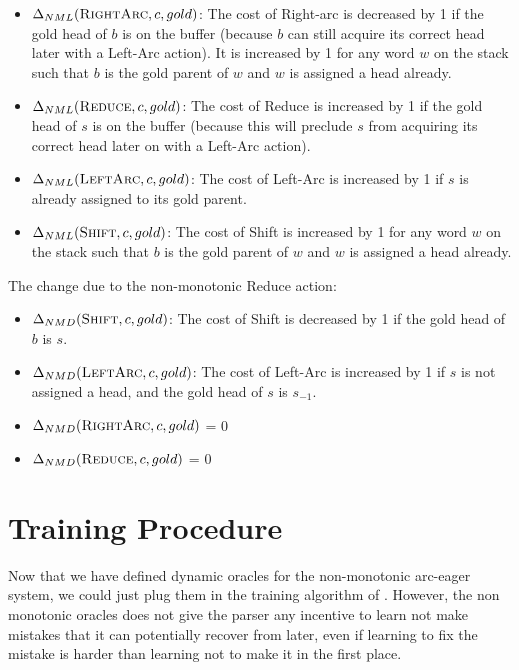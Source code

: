 \documentclass[11pt,letterpaper]{article}
\begin{document}
\begin{itemize}
   \item $\Delta_{NML}(\textsc{RightArc},c,gold)$: The cost of Right-arc is decreased by 1 if the gold head of $b$ is on the buffer
(because $b$ can still acquire its correct head later with a Left-Arc action).
It is increased by 1 for any word $w$ on the stack such that $b$ is the gold
parent of $w$ and $w$ is assigned a head already.

   \item $\Delta_{NML}(\textsc{Reduce},c,gold)$: The cost of Reduce is increased by 1 if the gold head of $s$ is on the buffer
(because this will preclude $s$ from acquiring its correct head later on with
a Left-Arc action).

   \item $\Delta_{NML}(\textsc{LeftArc},c,gold)$: The cost of Left-Arc is increased by 1 if $s$ is already assigned to its gold
parent.

  \item $\Delta_{NML}(\textsc{Shift},c,gold)$: The cost of Shift is increased by 1 for any word $w$ on the stack such that $b$ is the gold
parent of $w$ and $w$ is assigned a head already.
\end{itemize}

The change due to the non-monotonic Reduce action:
\begin{itemize}

   \item $\Delta_{NMD}(\textsc{Shift},c,gold)$: The cost of Shift is decreased by 1 if the gold head of $b$ is $s$.

   \item $\Delta_{NMD}(\textsc{LeftArc},c,gold)$: The cost of Left-Arc is increased by 1 if $s$ is not assigned a head, and the gold head of $s$ is $s_{-1}$.

   \item $\Delta_{NMD}(\textsc{RightArc},c,gold)$ = 0

   \item $\Delta_{NMD}(\textsc{Reduce},c,gold)$ = 0

\end{itemize}

\section{Training Procedure}

Now that we have defined dynamic oracles for the non-monotonic arc-eager
system, we could just plug them in the training algorithm of
\cite{coling2012}.  However, the non monotonic oracles does not give the
parser any incentive to learn not make mistakes that it can potentially recover from
later, even if learning to fix the mistake is harder than learning not to make
it in the first place.
\end{document}
